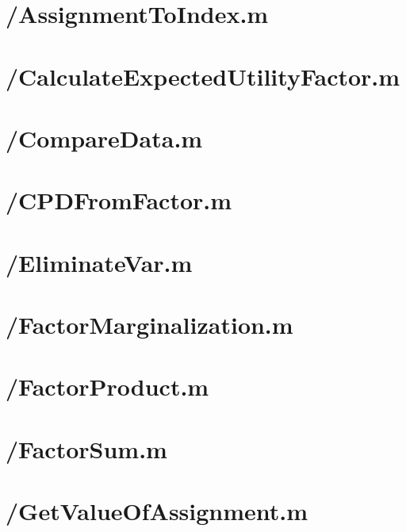 \documentclass{article}
\begin{document}
\tableofcontents
\newpage
\section{/AssignmentToIndex.m}

\section{/CalculateExpectedUtilityFactor.m}

\section{/CompareData.m}

\section{/CPDFromFactor.m}

\section{/EliminateVar.m}

\section{/FactorMarginalization.m}

\section{/FactorProduct.m}

\section{/FactorSum.m}

\section{/GetValueOfAssignment.m}

\end{document}
